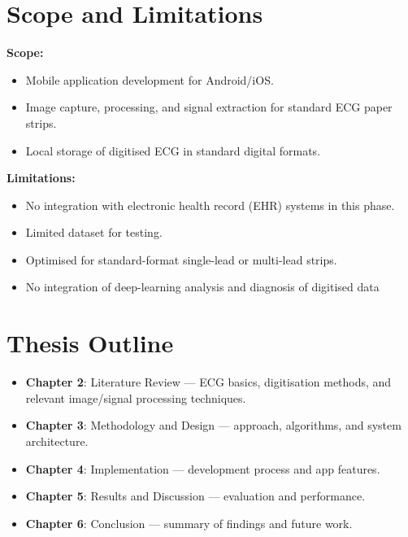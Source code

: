 \section{Scope and Limitations}

\textbf{Scope:}
\begin{itemize}
    \item Mobile application development for Android/iOS.
    \item Image capture, processing, and signal extraction for standard ECG paper strips.
    \item Local storage of digitised ECG in standard digital formats.
\end{itemize}

\textbf{Limitations:}
\begin{itemize}
    \item No integration with electronic health record (EHR) systems in this phase.
    \item Limited dataset for testing.
    \item Optimised for standard-format single-lead or multi-lead strips.
    \item No integration of deep-learning analysis and diagnosis of digitised data 
\end{itemize}

\section{Thesis Outline}
\begin{itemize}
    \item \textbf{Chapter 2}: Literature Review --- ECG basics, digitisation methods, and relevant image/signal processing techniques.
    \item \textbf{Chapter 3}: Methodology and Design --- approach, algorithms, and system architecture.
    \item \textbf{Chapter 4}: Implementation --- development process and app features.
    \item \textbf{Chapter 5}: Results and Discussion --- evaluation and performance.
    \item \textbf{Chapter 6}: Conclusion --- summary of findings and future work.
\end{itemize}
